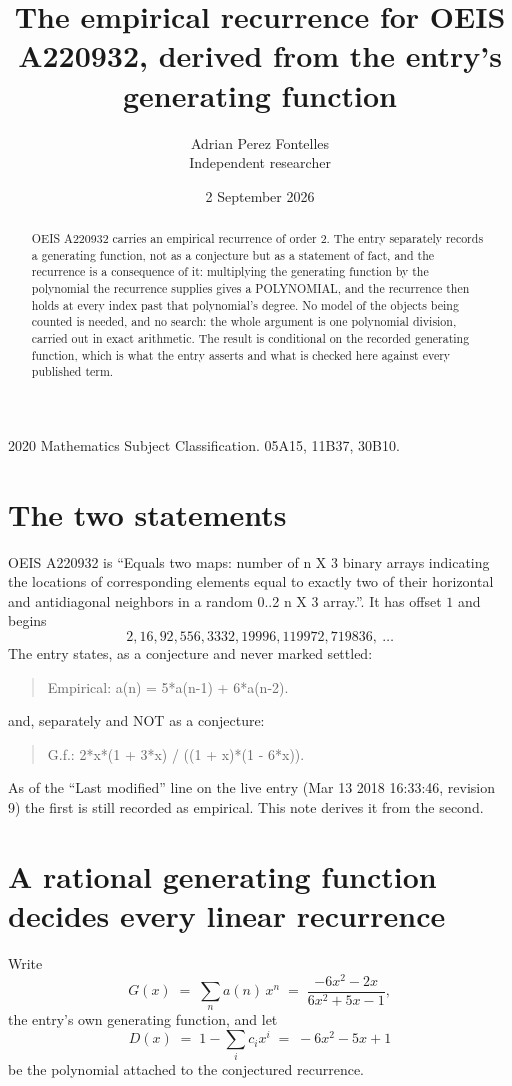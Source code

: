 \documentclass[11pt,a4paper]{article}
\title{The empirical recurrence for OEIS A220932, derived from the entry's generating function}
\author{Adrian Perez Fontelles\\ \small Independent researcher}
\date{2 September 2026}
\theoremstyle{plain}
\theoremstyle{definition}
\begin{document}
\maketitle

\begin{abstract}
OEIS A220932 carries an empirical recurrence of order $2$. The entry separately records a
generating function, not as a conjecture but as a statement of fact, and the recurrence is a
consequence of it: multiplying the generating function by the polynomial the recurrence
supplies gives a POLYNOMIAL, and the recurrence then holds at every index past that
polynomial's degree. No model of the objects being counted is needed, and no search: the
whole argument is one polynomial division, carried out in exact arithmetic. The result is
conditional on the recorded generating function, which is what the entry asserts and what is
checked here against every published term.
\end{abstract}

\noindent\small 2020 Mathematics Subject Classification. 05A15, 11B37, 30B10.\normalsize

\section{The two statements}

OEIS A220932 is ``Equals two maps: number of n X 3 binary arrays indicating the locations of corresponding elements equal to exactly two of their horizontal and antidiagonal neighbors in a random 0..2 n X 3 array.''. It has offset $1$ and begins
\[
2, 16, 92, 556, 3332, 19996, 119972, 719836,\ \dots
\]
The entry states, as a conjecture and never marked settled:
\begin{quote}
Empirical: a(n) = 5*a(n-1) + 6*a(n-2).
\end{quote}
and, separately and NOT as a conjecture:
\begin{quote}
G.f.: 2*x*(1 + 3*x) / ((1 + x)*(1 - 6*x)).
\end{quote}
As of the ``Last modified'' line on the live entry (Mar 13 2018 16:33:46, revision 9) the first is still
recorded as empirical. This note derives it from the second.

\section{A rational generating function decides every linear recurrence}

Write
\[
G(x)\;=\;\sum_{n}a(n)\,x^{n}\;=\;\frac{- 6 x^{2} - 2 x}{6 x^{2} + 5 x - 1},
\]
the entry's own generating function, and let
\[
D(x)\;=\;1-\sum_i c_i x^{i}\;=\;- 6 x^{2} - 5 x + 1
\]
be the polynomial attached to the conjectured recurrence.
\end{document}

